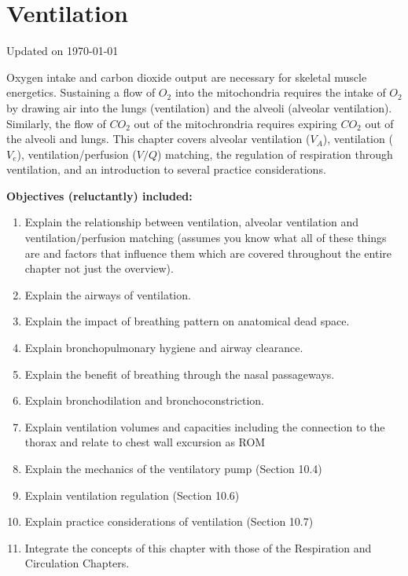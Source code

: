\chapter{Ventilation}\label{chp:ventilation}
Updated on \today
\minitoc

Oxygen intake and carbon dioxide output are necessary for skeletal muscle energetics. Sustaining a flow of $O_2$ into the mitochondria requires the intake of $O_2$ by drawing air into the lungs (ventilation) and the alveoli (alveolar ventilation). Similarly, the flow of $CO_2$ out of the mitochrondria requires expiring $CO_2$ out of the alveoli and lungs. This chapter covers alveolar ventilation ($V_A$), ventilation ($V_e$), ventilation/perfusion ($V/Q$) matching, the regulation of respiration through ventilation, and an introduction to several practice considerations.

\vspace{5mm}

\textbf{Objectives (reluctantly) included:}
\begin{enumerate}
    \item Explain the relationship between ventilation, alveolar ventilation and ventilation/perfusion matching (assumes you know what all of these things are and factors that influence them which are covered throughout the entire chapter not just the overview).
    \item Explain the airways of ventilation.
    \item Explain the impact of breathing pattern on anatomical dead space.
    \item Explain bronchopulmonary hygiene and airway clearance.
    \item Explain the benefit of breathing through the nasal passageways.
    \item Explain bronchodilation and bronchoconstriction.
    \item Explain ventilation volumes and capacities including the connection to the thorax and relate to chest wall excursion as ROM
    \item Explain the mechanics of the ventilatory pump (Section 10.4)
    \item Explain ventilation regulation (Section 10.6)
    \item Explain practice considerations of ventilation (Section 10.7)
    \item Integrate the concepts of this chapter with those of the Respiration and Circulation Chapters.
\end{enumerate}

